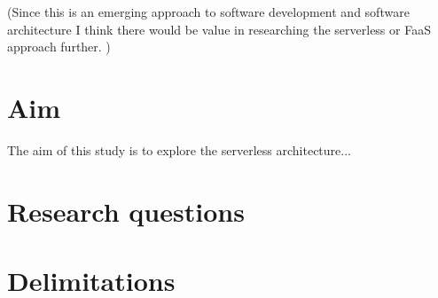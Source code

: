 (Since this is an emerging approach to software development and software architecture I think there would be value in researching the serverless or FaaS approach further. )



\section{Aim}
\label{sec:aim}
The aim of this study is to explore the serverless architecture...

\section{Research questions}
\label{sec:research-questions}




\section{Delimitations}
\label{sec:delimitations}






